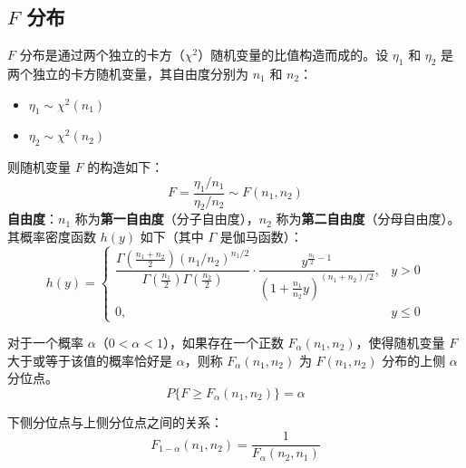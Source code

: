 \subsection{$F$ 分布}
\begin{definition}[$F$ 分布（构造）]
$F$ 分布是通过两个独立的卡方（$\chi^2$）随机变量的比值构造而成的。设 $\eta_1$ 和 $\eta_2$ 是两个独立的卡方随机变量，其自由度分别为 $n_1$ 和 $n_2$：
\begin{itemize}
	\item $\eta_1 \sim \chi^2(n_1)$
	\item $\eta_2 \sim \chi^2(n_2)$
\end{itemize}
则随机变量 $F$ 的构造如下：
\begin{equation}
	F = \frac{\eta_1/n_1}{\eta_2/n_2} \sim F(n_1, n_2)
	\label{eq:抽样分布:F构造}
\end{equation}
\textbf{自由度}：$n_1$ 称为\textbf{第一自由度}（分子自由度），$n_2$ 称为\textbf{第二自由度}（分母自由度）。其概率密度函数 $h(y)$ 如下（其中 $\Gamma$ 是伽马函数）：
\begin{equation}
	h(y) = \begin{cases} \dfrac{\Gamma\left(\frac{n_1+n_2}{2}\right) \left(n_1/n_2\right)^{n_1/2}}{\Gamma\left(\frac{n_1}{2}\right) \Gamma\left(\frac{n_2}{2}\right)} \cdot \dfrac{y^{\frac{n_1}{2}-1}}{\left(1+\frac{n_1}{n_2}y\right)^{(n_1+n_2)/2}}, & y > 0 \\[1ex] 0, & y \le 0 \end{cases}
	\label{eq:抽样分布:F密度}
\end{equation}
\end{definition}

\begin{definition}[$F$ 分布的分位点]
对于一个概率 $\alpha$（$0 < \alpha < 1$），如果存在一个正数 $F_{\alpha}(n_1, n_2)$，使得随机变量 $F$ 大于或等于该值的概率恰好是 $\alpha$，则称 $F_{\alpha}(n_1, n_2)$ 为 $F(n_1, n_2)$ 分布的上侧 $\alpha$ 分位点。
\begin{equation}
	P\{F \ge F_{\alpha}(n_1, n_2)\} = \alpha
	\label{eq:抽样分布:F分位点}
\end{equation}
\end{definition}

\begin{keybox}[分位点的重要性质]
下侧分位点与上侧分位点之间的关系：
\begin{equation}
	F_{1-\alpha}(n_1, n_2) = \frac{1}{F_{\alpha}(n_2, n_1)}
	\label{eq:抽样分布:F分位点性质}
\end{equation}
\end{keybox}

